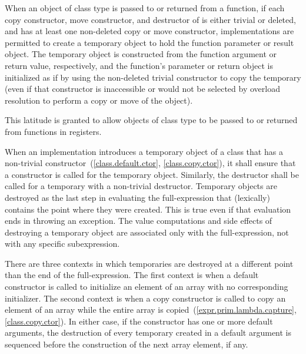 \pnum
When an object of class type 
is passed to or returned from a function,
if each copy constructor, move constructor, and destructor of 
is either trivial or deleted,
and 
has at least one non-deleted copy or move constructor,
implementations are permitted
to create a temporary object
to hold the function parameter or result object.
The temporary object is constructed
from the function argument or return value, respectively,
and the function's parameter or return object
is initialized as if by
using the non-deleted trivial constructor to copy the temporary
(even if that constructor is inaccessible
or would not be selected by overload resolution
to perform a copy or move of the object).
\begin{note}
This latitude is granted to allow objects of class type to be passed to or returned from functions in registers.
\end{note}

\pnum
{}%
%
%
When an implementation introduces a temporary object of a class that has a
non-trivial constructor~(\ref{class.default.ctor}, \ref{class.copy.ctor}),
it shall ensure that a constructor is called for the temporary object.
Similarly, the destructor shall be called for a temporary with a non-trivial
destructor.
Temporary objects are destroyed as the last step
in evaluating
the full-expression
that (lexically) contains the point where
they were created.
This is true even if that evaluation ends in throwing an exception.
The
%
value computations and
%
side effects of destroying a temporary object
are associated only with the full-expression, not with any specific
subexpression.

\pnum
{}%
%
There are three contexts in which temporaries are destroyed at a different
point than the end of the full-expression.
The first context is when a default constructor is called to initialize
an element of an array with no corresponding initializer.
The second context is when a copy constructor is called to copy an element of
an array while the entire array is copied~(\ref{expr.prim.lambda.capture}, \ref{class.copy.ctor}).
In either case, if the constructor has one or more default arguments,
the destruction of every temporary created in a default argument is
sequenced before the construction of the next array element, if any.

